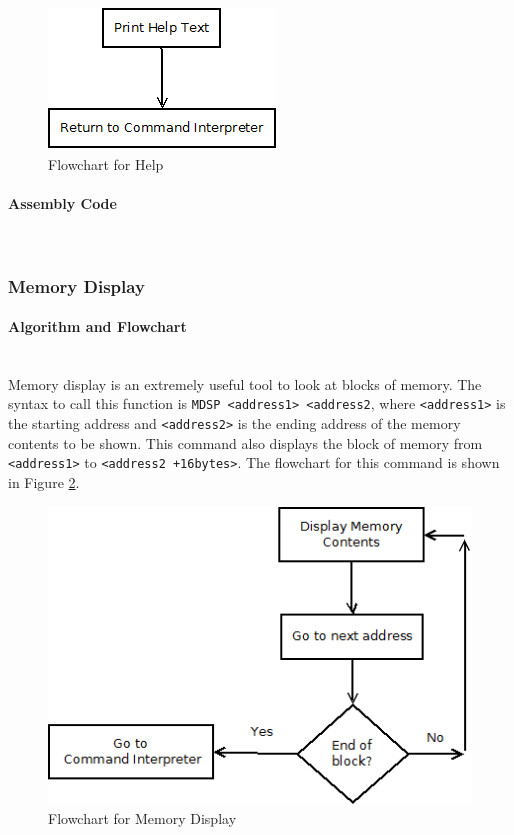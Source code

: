 \documentclass[12pt]{article}
\begin{document}
			\begin{figure}[H]
				\centering
				\includegraphics[width=0.4\linewidth]{help}
				\caption{Flowchart for Help}
				\label{fig:help}
			\end{figure}
			
			\paragraph{Assembly Code}~\\
			
			\subsubsection{Memory Display}
			\paragraph{Algorithm and Flowchart}~\\
			Memory display is an extremely useful tool to look at blocks of memory. The syntax to call this function is \texttt{MDSP <address1> <address2}, where \texttt{<address1>} is the starting address and \texttt{<address2>} is the ending address of the memory contents to be shown. This command also displays the block of memory from \texttt{<address1>} to \texttt{<address2 +16bytes>}. The flowchart for this command is shown in Figure \ref{fig:memdsp}.
				
			\begin{figure}[H]
				\centering
				\includegraphics[width=.7\linewidth]{memdsp}
				\caption{Flowchart for Memory Display}
				\label{fig:memdsp}
			\end{figure}
			
\end{document}
